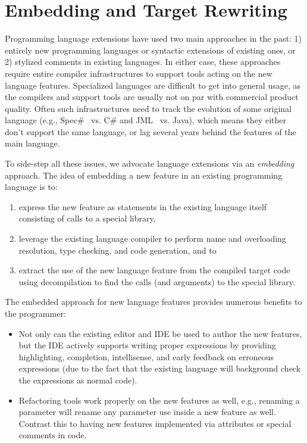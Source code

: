 \documentclass[10pt, conference, compsocconf]{IEEEtran}
\newcommand{\csharp}{C\#}
\begin{document}
\section{Embedding and Target Rewriting}
\label{sec:embed}
\noindent
Programming language extensions have used two main approaches in
the past: 1) entirely new programming languages or syntactic
extensions of existing ones, or 2) stylized comments in existing languages.
  In either case, these approaches
require entire compiler infrastructures to support tools acting on the
new language features. Specialized languages are difficult to get into
general usage, as the compilers and support tools are usually not on
par with commercial product quality. Often such infrastructures need
to track the evolution of some original language (e.g., Spec\#~\cite{SpecSharp} vs. \csharp{} and
JML~\cite{JML} vs. Java), which means they either don't support the same
language, or lag several years behind the features of the main
language.  

To side-step all these issues, we advocate language extensions
via an \emph{embedding}~\cite{embedded-cc-sac-oops-2010} approach.  The idea of embedding a
new feature in an existing programming language is to:
\begin{enumerate}
\item express the new feature as statements in the
  existing language itself consisting of calls to a special library,
\item leverage the existing language
compiler to perform name and overloading resolution, type checking,
and code generation, and to
\item extract the use of the new language feature from the compiled
  target code using decompilation to find the calls (and arguments) to the special library.
\end{enumerate}

The embedded approach for new language features provides
numerous benefits to the programmer:
\begin{itemize}
\item Not only can the existing editor and IDE be used to author the
  new features, but the IDE actively supports writing proper 
  expressions by providing highlighting, completion, intellisense, and
  early feedback on erroneous expressions (due to the fact that the
  existing language will background check the expressions as normal
  code).
\item Refactoring tools work properly on the new features as well, e.g.,
  renaming a parameter will rename any parameter use inside
  a new feature as well. Contrast this to having new features
  implemented via attributes or special comments in code.
\end{itemize}
\end{document}
